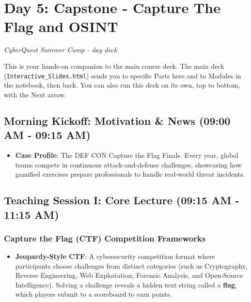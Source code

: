 \documentclass[12pt,openany]{book}
\begin{document}
\section*{Day 5: Capstone - Capture The Flag and OSINT}
{\small\itshape\color{gray}CyberQuest Summer Camp - day deck}


This is your hands-on companion to the main course deck. The main deck (\texttt{Interactive\_Slides.html}) sends you to specific Parts here and to Modules in the notebook, then back. You can also run this deck on its own, top to bottom, with the Next arrow.

\medskip

\subsection*{Morning Kickoff: Motivation \& News (09:00 AM - 09:15 AM)}


\begin{itemize}

  \item \textbf{Case Profile}: The DEF CON Capture the Flag Finals. Every year, global teams compete in continuous attack-and-defense challenges, showcasing how gamified exercises prepare professionals to handle real-world threat incidents.

\end{itemize}

\medskip

\subsection*{Teaching Session I: Core Lecture (09:15 AM - 11:15 AM)}


\subsubsection*{Capture the Flag (CTF) Competition Frameworks}


\begin{itemize}

  \item \textbf{Jeopardy-Style CTF}: A cybersecurity competition format where participants choose challenges from distinct categories (such as Cryptography, Reverse Engineering, Web Exploitation, Forensic Analysis, and Open-Source Intelligence). Solving a challenge reveals a hidden text string called a \textbf{flag}, which players submit to a scoreboard to earn points.

\end{itemize}
\end{document}
